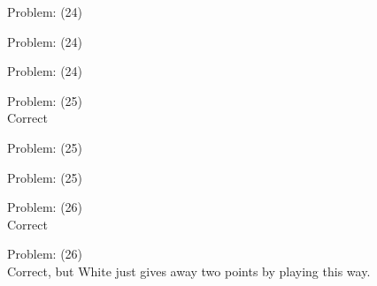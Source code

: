 \documentclass[11pt]{article}
\begin{document}
\begin{minipage}[t]{0.5\textwidth}
  {\centering
  
  Problem: (24)\\
  
  }
\end{minipage}
\begin{minipage}[t]{0.5\textwidth}
  {\centering
  
  Problem: (24)\\
  
  }
\end{minipage}
\begin{minipage}[t]{0.5\textwidth}
  {\centering
  
  Problem: (24)\\
  
  }
\end{minipage}
\begin{minipage}[t]{0.5\textwidth}
  {\centering
  
  Problem: (25)\\
  Correct\\
  }
\end{minipage}
\begin{minipage}[t]{0.5\textwidth}
  {\centering
  
  Problem: (25)\\
  
  }
\end{minipage}
\begin{minipage}[t]{0.5\textwidth}
  {\centering
  
  Problem: (25)\\
  
  }
\end{minipage}
\begin{minipage}[t]{0.5\textwidth}
  {\centering
  
  Problem: (26)\\
  Correct\\
  }
\end{minipage}
\begin{minipage}[t]{0.5\textwidth}
  {\centering
  
  Problem: (26)\\
  Correct, but White just gives away two points by playing this way.\\
  }
\end{minipage}
\end{document}
